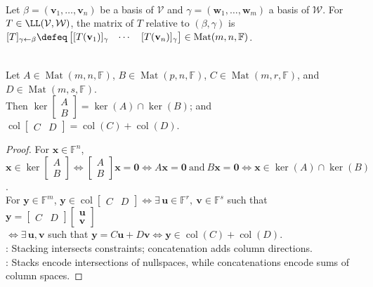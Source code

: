 \begin{definition} \\
Let $\beta = (\mathbf{v}_1, \ldots, \mathbf{v}_n)$ be a basis of $\mathcal{V}$ and $\gamma = (\mathbf{w}_1, \ldots, \mathbf{w}_m)$ a basis of $\mathcal{W}$. For $T \in \LL(\mathcal{V}, \mathcal{W})$, the matrix of $T$ relative to $(\beta,\gamma)$ is $[T]_{\gamma \leftarrow \beta} \defeq
\begin{bmatrix}
[T(\mathbf{v}_1)]_{\gamma} & \cdots & [T(\mathbf{v}_n)]_{\gamma}
\end{bmatrix}
\in \operatorname{Mat}(m,n,\mathbb{F})$.
\end{definition}

\begin{proposition} \label{prop:stacked-nullspaces-and-concatenated-column-spaces} \\
Let $A\in\operatorname{Mat}(m,n,\mathbb{F})$, $B\in\operatorname{Mat}(p,n,\mathbb{F})$, $C\in\operatorname{Mat}(m,r,\mathbb{F})$, and $D\in\operatorname{Mat}(m,s,\mathbb{F})$.\\
Then $\ker\begin{bmatrix} A\\ B\end{bmatrix}=\ker(A)\cap\ker(B)$; and $\operatorname{col}\begin{bmatrix} C & D\end{bmatrix} =\operatorname{col}(C)+\operatorname{col}(D)$.
\begin{proof}
For $\mathbf{x}\in\mathbb{F}^n$, $\mathbf{x}\in\ker\begin{bmatrix}A\\ B\end{bmatrix} \iff \begin{bmatrix}A\\ B\end{bmatrix}\mathbf{x}=\mathbf{0} \iff A\mathbf{x}=\mathbf{0}\ \text{and}\ B\mathbf{x}=\mathbf{0} \iff \mathbf{x}\in\ker(A)\cap\ker(B)$.\\
For $\mathbf{y}\in\mathbb{F}^m$, $\mathbf{y}\in\operatorname{col}\begin{bmatrix}C&D\end{bmatrix} \iff \exists\,\mathbf{u}\in\mathbb{F}^r,\ \mathbf{v}\in\mathbb{F}^s$ such that $\mathbf{y}=\begin{bmatrix}C&D\end{bmatrix}\begin{bmatrix}\mathbf{u}\\ \mathbf{v}\end{bmatrix}$\\
$\iff \exists\,\mathbf{u},\mathbf{v}$ such that $\mathbf{y}=C\mathbf{u}+D\mathbf{v} \iff \mathbf{y}\in\operatorname{col}(C)+\operatorname{col}(D)$.\\
: Stacking intersects constraints; concatenation adds column directions.\\
: Stacks encode intersections of nullspaces, while concatenations encode sums of column spaces.
\end{proof}
\end{proposition}

